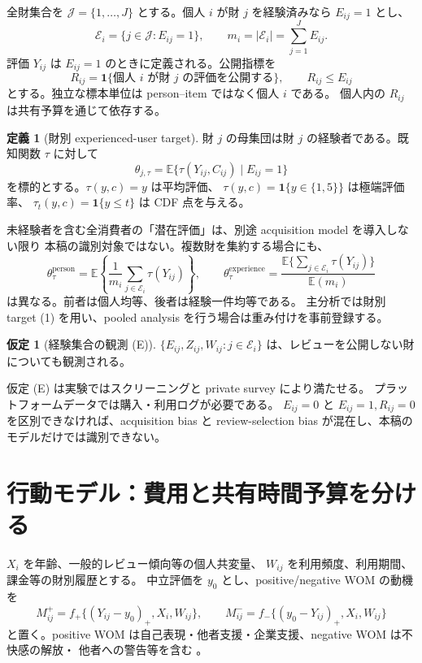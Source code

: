 \documentclass[a4paper,11pt]{ltjsarticle}
\newcommand{\E}{\mathbb E}
\newcommand{\1}{\mathbf 1}
\newcommand{\cJ}{\mathcal J}
\newcommand{\cE}{\mathcal E}
\theoremstyle{definition}
\newtheorem{definition}{定義}
\newtheorem{assumption}{仮定}
\theoremstyle{plain}
\theoremstyle{remark}
\begin{document}
全財集合を $\cJ=\{1,\ldots,J\}$ とする。個人 $i$ が財 $j$ を経験済みなら
$E_{ij}=1$ とし、
\[
  \cE_i=\{j\in\cJ:E_{ij}=1\},
  \qquad m_i=|\cE_i|=\sum_{j=1}^J E_{ij}.
\]
評価 $Y_{ij}$ は $E_{ij}=1$ のときに定義される。公開指標を
\[
  R_{ij}=\1\{\text{個人 $i$ が財 $j$ の評価を公開する}\},
  \qquad R_{ij}\le E_{ij}
\]
とする。独立な標本単位は person--item ではなく個人 $i$ である。
個人内の $R_{ij}$ は共有予算を通じて依存する。

\begin{definition}[財別 experienced-user target]
財 $j$ の母集団は財 $j$ の経験者である。既知関数 $\tau$ に対して
\[
  \theta_{j,\tau}
  =\E\{\tau(Y_{ij},C_{ij})\mid E_{ij}=1\}
  \tag{1}
\]
を標的とする。$\tau(y,c)=y$ は平均評価、
$\tau(y,c)=\1\{y\in\{1,5\}\}$ は極端評価率、
$\tau_t(y,c)=\1\{y\le t\}$ は CDF 点を与える。
\end{definition}

未経験者を含む全消費者の「潜在評価」は、別途 acquisition model を導入しない限り
本稿の識別対象ではない。複数財を集約する場合にも、
\[
 \theta^{\mathrm{person}}_\tau
 =\E\left\{\frac{1}{m_i}\sum_{j\in\cE_i}\tau(Y_{ij})\right\},
 \qquad
 \theta^{\mathrm{experience}}_\tau
 =\frac{\E\{\sum_{j\in\cE_i}\tau(Y_{ij})\}}{\E(m_i)}
 \tag{2}
\]
は異なる。前者は個人均等、後者は経験一件均等である。
主分析では財別 target (1) を用い、pooled analysis を行う場合は重み付けを事前登録する。

\begin{assumption}[経験集合の観測 (E)]
$\{E_{ij},Z_{ij},W_{ij}:j\in\cE_i\}$ は、レビューを公開しない財についても観測される。
\end{assumption}

仮定 (E) は実験ではスクリーニングと private survey により満たせる。
プラットフォームデータでは購入・利用ログが必要である。
$E_{ij}=0$ と $E_{ij}=1,R_{ij}=0$ を区別できなければ、acquisition bias と
review-selection bias が混在し、本稿のモデルだけでは識別できない。

\section{行動モデル：費用と共有時間予算を分ける}

$X_i$ を年齢、一般的レビュー傾向等の個人共変量、
$W_{ij}$ を利用頻度、利用期間、課金等の財別履歴とする。
中立評価を $y_0$ とし、positive/negative WOM の動機を
\[
 M^+_{ij}=f_+\{(Y_{ij}-y_0)_+,X_i,W_{ij}\},
 \qquad
 M^-_{ij}=f_-\{(y_0-Y_{ij})_+,X_i,W_{ij}\}
 \tag{3}
\]
と置く。positive WOM は自己表現・他者支援・企業支援、negative WOM は不快感の解放・
他者への警告等を含む \parencite{HennigThurauEtAl2004,Berger2014}。
\end{document}

